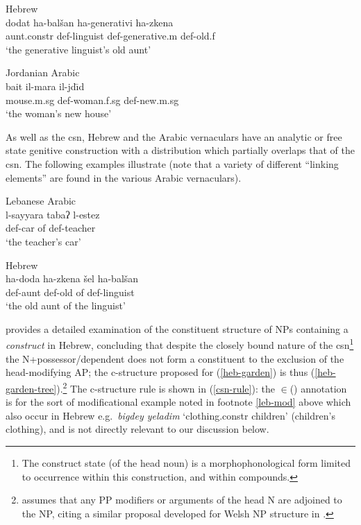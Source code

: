 \documentclass[output=paper,hidelinks]{langscibook}
\begin{document}
\ea \label{adj-heb} Hebrew \citep[106]{Falk07} \\
 \gll dodat ha-balšan ha-generativi ha-zkena\\
aunt.{\sc constr} {\sc def}-linguist {\sc def}-generative.{\sc m} {\sc def}-old.{\sc f}\\
\glt `the generative linguist's old aunt'
\z

\ea \label{jdiid} Jordanian Arabic \citep[152]{Alhailawani:PhD}\\
\gll bait il-mara il-jd\={\i}d\\
mouse.{\sc m.sg} {\sc def}-woman.{\sc f.sg} {\sc def}-new.{\sc m.sg}\\
\glt `the woman's new house'
\z

As well as the  {\sc csn}, Hebrew and the Arabic vernaculars have an analytic or free state genitive construction with a distribution which partially overlaps that of the {\sc csn}. The following examples illustrate (note that a variety of different ``linking elements'' are found in the various Arabic vernaculars).


\ea \label{fs-leb}  Lebanese Arabic \citep[77]{Ouwayda}\\
\gll l-sayyara taba{ʔ} l-estez\\
{\sc def}-car of {\sc def}-teacher\\
\glt `the teacher's car'
\z



\ea
\label{Sem:lp} Hebrew \citep[104]{Falk07} \\
\gll ha-doda ha-zkena šel ha-balšan\\
{\sc def}-aunt {\sc def}-old of {\sc def}-linguist\\
\glt `the old aunt of the linguist'
\z

\citet{Falk01actnom}  provides a detailed examination of the constituent structure of NPs containing a {\em construct} in Hebrew, concluding that despite the closely bound nature of the {\sc csn}\footnote{The construct state (of the head noun) is a morphophonological form limited to occurrence within this construction, and within compounds.} the N+possessor/dependent  does not form a constituent to the exclusion of the head-modifying AP; the c-structure proposed for  (\ref{heb-garden}) is thus
(\ref{heb-garden-tree}).\footnote{\citet{Falk07} assumes that any  PP modifiers or arguments of the head N are adjoined to the NP, citing a similar proposal developed  for Welsh NP structure in \citet{Sadler00}.}
The c-structure rule is shown in (\ref{csn-rule}):  the \DOWN$\in$(\UP\ADJ) annotation is for the sort of modificational example noted in footnote \ref{leb-mod} above which also occur in Hebrew e.g.\  {\em bigdey yeladim} `clothing.{\sc constr} children' (children's clothing), and is not directly relevant to our discussion below.
\end{document}
